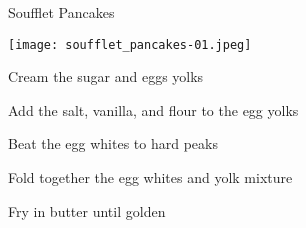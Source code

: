 \documentclass{recipe}
\begin{document}
\begin{recipe}{Soufflet Pancakes}

  \begin{ingredients}
  \end{ingredients}

  \begin{images}
    \begin{image}
      \texttt{[image: soufflet\_pancakes-01.jpeg]}
    \end{image}
  \end{images}

  \begin{steps}
  \item Cream the sugar and eggs yolks
  \item Add the salt, vanilla, and flour to the egg yolks
  \item Beat the egg whites to hard peaks
  \item Fold together the egg whites and yolk mixture
  \item Fry in butter until golden
  \end{steps}
\end{recipe}
\end{document}
